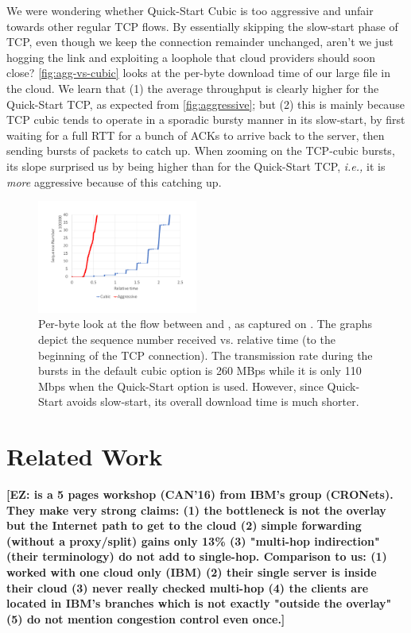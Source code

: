 \documentclass[sigconf,usenames,dvipsnames,geometry]{acmart}
\newcommand{\mycomm}[3]{{\color{#2} \textbf{[#1: #3]}}}
\newcommand{\mycomm}[3]{}
\newcommand{\EZ}[1]{\mycomm{EZ}{BlueGreen}{#1}}
\providecommand{\vs}{vs. }
\providecommand{\ie}{\emph{i.e.,} }
\begin{document}
We were wondering whether Quick-Start Cubic is too aggressive and unfair towards other regular TCP flows. By essentially skipping the slow-start phase of TCP, even though we keep the connection remainder unchanged, aren't we just hogging the link and exploiting a loophole
that cloud providers should soon close?
\autoref{fig:agg-vs-cubic} looks at the per-byte download time of our large file in the cloud. We learn that (1) the average throughput is clearly higher for the Quick-Start TCP, as expected from \autoref{fig:aggressive}; but (2) this is mainly because TCP cubic tends to operate in a sporadic bursty manner in its slow-start, by first waiting for a full RTT for a bunch of ACKs to arrive back to the server, then sending bursts of packets to catch up. When zooming on the TCP-cubic bursts, its slope surprised us by being higher than for the Quick-Start TCP, \ie it is \textit{more} aggressive because of this catching up. 
\begin{figure}[!t]
  \centering
    \includegraphics[width=0.47\textwidth,trim=2mm 2mm 2mm 2mm,clip]{figures/CubicVsAggressive-seq}
    \caption{Per-byte look at the flow between \rs and \rc, as captured on \rc. The graphs depict the sequence number received \vs relative time (to the beginning of the TCP connection). The transmission rate during the bursts in the default cubic option is 260 MBps while it is only 110 Mbps when the Quick-Start option is used. However, since Quick-Start avoids slow-start, its overall download time is much shorter.  
    }
    \label{fig:agg-vs-cubic}
\end{figure}

\section{Related Work}
\EZ{ \cite{le2016understanding} is a 5 pages workshop (CAN'16) from IBM's group (CRONets). They make very strong claims: (1) the bottleneck is not the overlay but the Internet path to get to the cloud (2) simple forwarding (without a proxy/split) gains only 13\% (3) "multi-hop indirection" (their terminology) do not add to single-hop. Comparison to us: (1) worked with one cloud only (IBM) (2) their single server is inside their cloud (3) never really checked multi-hop (4) the clients are located in IBM's branches which is not exactly "outside the overlay" (5) do not mention congestion control even once.}
\end{document}
